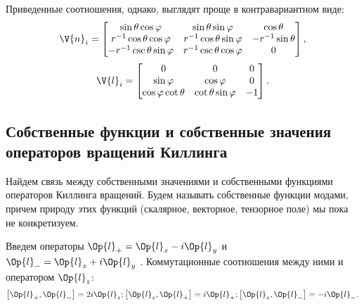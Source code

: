     Приведенные соотношения, однако, выглядят проще в контравариантном виде:
    \begin{equation}
        \V{n}_i
        =
        \begin{bmatrix}
            \sin\theta \cos\varphi          & \sin\theta \sin\varphi        & \cos\theta \\
            r^{-1} \cos\theta \cos\varphi   & r^{-1} \cos\theta \sin\varphi & - r^{-1} \sin\theta \\
            - r^{-1} \csc\theta \sin\varphi & r^{-1} \csc\theta \cos\varphi & 0
        \end{bmatrix}
        ,
    \end{equation}
    \begin{equation}
        \V{l}_i
        =
        \begin{bmatrix}
            0
                & 0
                & 0 \\
            \sin\varphi
                & \cos\varphi
                & 0 \\
            \cos\varphi \cot\theta
                & \cot\theta \sin\varphi
                & - 1
        \end{bmatrix}
        .
    \end{equation}

%
%
%
%
%
%

\subsection{Собственные функции и собственные значения операторов вращений Киллинга}

    Найдем связь между собственными значениями и собственными функциями операторов Киллинга вращений. Будем называть собственные функции модами, причем природу этих функций (скалярное, векторное, тензорное поле) мы пока не конкретизуем.

    Введем операторы $\Op{l}_{+} = \Op{l}_x - i\Op{l}_y$ и $\Op{l}_{-} = \Op{l}_x + i\Op{l}_y$ \cite{burlankov_space_dynamics,burlankov_tmf}. Коммутационные соотношения между ними и оператором $\Op{l}_z$:
    \begin{equation}
        \left[ \Op{l}_{+}, \Op{l}_{-} \right] = 2 i \Op{l}_{z} ;
        \left[ \Op{l}_{z}, \Op{l}_{+} \right] =   i \Op{l}_{+} ;
        \left[ \Op{l}_{z}, \Op{l}_{-} \right] = - i \Op{l}_{-} .
    \end{equation}

